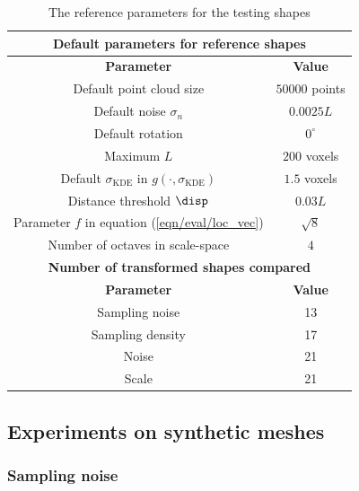 \begin{table}[ht]
\centering
\begin{tabular}{|c|c|}
\hline
\multicolumn{2}{c}{ \textbf{Default parameters for reference shapes }} \\ 
\hline 
\textbf{Parameter} & \textbf{Value} \\
\hline
Default point cloud size & $50000$ points\\
Default noise $\sigma_{n}$ & $0.0025L$\\ 
Default rotation & $0^{\circ}$\\
Maximum $L$ & $200$ voxels\\
Default $\sigma_{\textrm{KDE}}$ in $g(\cdot,\sigma_{\textrm{KDE}})$ & $1.5$ voxels \\ 
Distance threshold $\disp$ & $0.03L$ \\
Parameter $f$ in equation (\ref{eqn/eval/loc_vec}) & $\sqrt{8}$ \\
Number of octaves in scale-space & $4$ \\
\hline
\multicolumn{2}{c}{ \textbf{ Number of transformed shapes compared }} \\
\hline 
\textbf{Parameter} & \textbf{Value} \\
\hline
Sampling noise & 13 \\
Sampling density & 17 \\
Noise & 21 \\
Scale & 21 \\
\hline
\end{tabular}
\caption{The reference parameters for the testing shapes}
\label{tab/eval/referenceparam}
\end{table}

\subsection{Experiments on synthetic meshes}

\subsubsection{Sampling noise}

